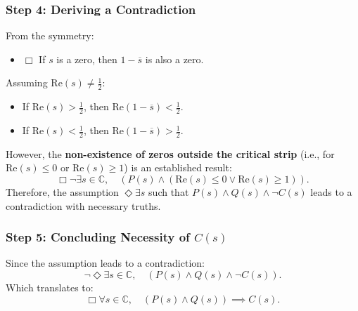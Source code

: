 \documentclass{article}
\begin{document}
\begin{itemize}
\end{itemize} \subsubsection{Step 4: Deriving a Contradiction} From the symmetry: \begin{itemize} \item $\Box$ If $s$ is a zero, then $1 - \overline{s}$ is also a zero.
\end{itemize} Assuming $\mathrm{Re}(s) \neq \tfrac{1}{2}$: \begin{itemize} \item If $\mathrm{Re}(s) > \tfrac{1}{2}$, then $\mathrm{Re}(1 - \overline{s}) < \tfrac{1}{2}$. \item If $\mathrm{Re}(s) < \tfrac{1}{2}$, then $\mathrm{Re}(1 - \overline{s}) > \tfrac{1}{2}$.
\end{itemize} However, the \textbf{non-existence of zeros outside the critical strip} (i.e., for $\mathrm{Re}(s) \leq 0$ or $\mathrm{Re}(s) \geq 1$) is an established result: \[
\Box \neg \exists s \in \mathbb{C}, \quad \left( P(s) \land \left( \mathrm{Re}(s) \leq 0 \lor \mathrm{Re}(s) \geq 1 \right) \right).
\] Therefore, the assumption $\Diamond \exists s$ such that $P(s) \land Q(s) \land \neg C(s)$ leads to a contradiction with necessary truths. \subsubsection{Step 5: Concluding Necessity of $C(s)$} Since the assumption leads to a contradiction: \[
\neg \Diamond \exists s \in \mathbb{C}, \quad \left( P(s) \land Q(s) \land \neg C(s) \right).
\] Which translates to: \[
\Box \forall s \in \mathbb{C}, \quad \left( P(s) \land Q(s) \right) \implies C(s).
\]
\end{document}
